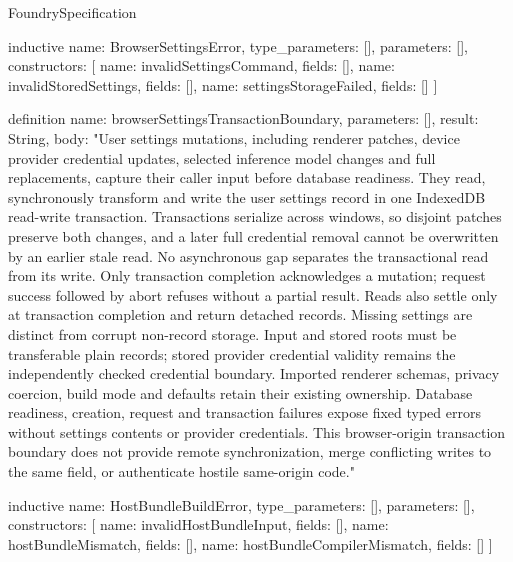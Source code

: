 \begin{lexlean}{FoundrySpecification}
\begin{semanticmodule}
inductive{
  name: BrowserSettingsError,
  type_parameters: [],
  parameters: [],
  constructors: [
    {name: invalidSettingsCommand, fields: []},
    {name: invalidStoredSettings, fields: []},
    {name: settingsStorageFailed, fields: []}
  ]
}

definition{
  name: browserSettingsTransactionBoundary,
  parameters: [],
  result: String,
  body: "User settings mutations, including renderer patches, device provider credential updates, selected inference model changes and full replacements, capture their caller input before database readiness. They read, synchronously transform and write the user settings record in one IndexedDB read-write transaction. Transactions serialize across windows, so disjoint patches preserve both changes, and a later full credential removal cannot be overwritten by an earlier stale read. No asynchronous gap separates the transactional read from its write. Only transaction completion acknowledges a mutation; request success followed by abort refuses without a partial result. Reads also settle only at transaction completion and return detached records. Missing settings are distinct from corrupt non-record storage. Input and stored roots must be transferable plain records; stored provider credential validity remains the independently checked credential boundary. Imported renderer schemas, privacy coercion, build mode and defaults retain their existing ownership. Database readiness, creation, request and transaction failures expose fixed typed errors without settings contents or provider credentials. This browser-origin transaction boundary does not provide remote synchronization, merge conflicting writes to the same field, or authenticate hostile same-origin code."
}

inductive{
  name: HostBundleBuildError,
  type_parameters: [],
  parameters: [],
  constructors: [
    {name: invalidHostBundleInput, fields: []},
    {name: hostBundleMismatch, fields: []},
    {name: hostBundleCompilerMismatch, fields: []}
  ]
}


\end{semanticmodule}
\end{lexlean}
